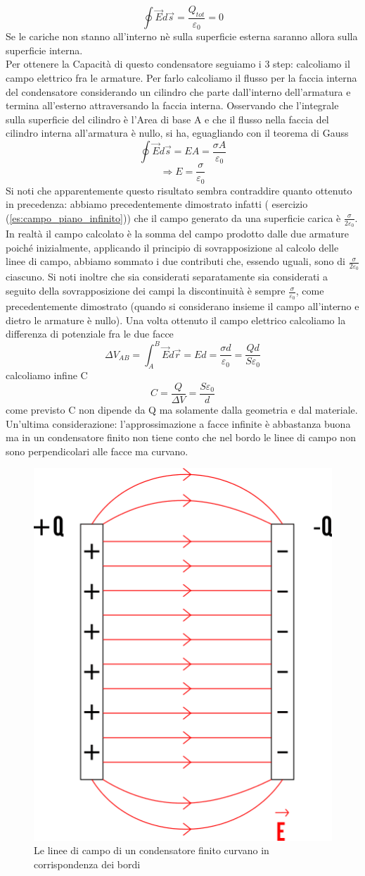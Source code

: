 \documentclass[10pt,a4paper]{article}
\begin{document}
\[\oint \vec{E}d\vec{s}= \frac{Q_{tot}}{\varepsilon_0}=0\]
Se le cariche non stanno all'interno nè sulla superficie esterna saranno allora sulla superficie interna.\\
Per ottenere la Capacità di questo condensatore seguiamo i 3 step: calcoliamo il campo elettrico fra le armature.
Per farlo calcoliamo il flusso per la faccia interna del condensatore considerando un cilindro che parte dall'interno dell'armatura e termina all'esterno attraversando la faccia interna. Osservando che l'integrale sulla superficie del cilindro è l'Area di base A e che il flusso nella faccia del cilindro interna all'armatura è nullo, si ha, eguagliando con il teorema di Gauss
\[\oint\vec{E}d\vec{s} = EA = \frac{\sigma A}{\varepsilon_0}\]
\[\Rightarrow E = \frac{\sigma}{\varepsilon_0}\]
Si noti che apparentemente questo risultato sembra contraddire quanto ottenuto in precedenza: abbiamo precedentemente dimostrato infatti ( esercizio (\ref{es:campo_piano_infinito})) che il campo generato da una superficie carica è $\frac{\sigma}{2\varepsilon_0}$. In realtà il campo calcolato è la somma del campo prodotto dalle due armature poiché inizialmente, applicando il principio di sovrapposizione al calcolo delle linee di campo, abbiamo sommato i due contributi che, essendo uguali, sono di $\frac{\sigma}{2\varepsilon_0}$ ciascuno. Si noti inoltre che sia considerati separatamente sia considerati a seguito della sovrapposizione dei campi la discontinuità è sempre $\frac{\sigma}{\varepsilon_0}$, come precedentemente dimostrato (quando si considerano insieme il campo all'interno e dietro le armature è nullo).
Una volta ottenuto il campo elettrico calcoliamo la differenza di potenziale fra le due facce 
\[\Delta V_{AB} = \int_{A}^{B}\vec{E}d\vec{r} = Ed=\frac{\sigma d}{\varepsilon_0}=\frac{Q d}{S\varepsilon_0}\]
calcoliamo infine C
\[C = \frac{Q}{\Delta V} = \frac{S\varepsilon_0}{d}\]
come previsto C non dipende da Q ma solamente dalla geometria e dal materiale.\\
Un'ultima considerazione: l'approssimazione a facce infinite è abbastanza buona ma in un condensatore finito non tiene conto che nel bordo le linee di campo non sono perpendicolari alle facce ma curvano. 
\begin{figure}[h!]
	\centering
	\includegraphics[width=0.4\linewidth]{images/condensatore-piano-2}
	\caption{Le linee di campo di un condensatore finito curvano in corrispondenza dei bordi}
	\label{fig:condensatore-piano-2}
\end{figure}
\FloatBarrier
\end{document}
